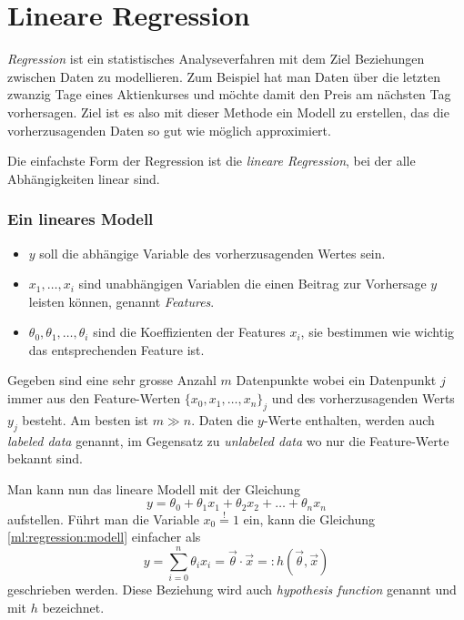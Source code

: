 %
%
%
%

\section{Lineare Regression\label{chapter:ml:regression}}

\emph{Regression} ist ein statistisches Analyseverfahren mit dem Ziel Beziehungen zwischen
Daten zu modellieren. Zum Beispiel hat man Daten über die letzten zwanzig Tage eines
Aktienkurses und möchte damit den Preis am nächsten Tag vorhersagen. Ziel ist es also mit
dieser Methode ein Modell zu erstellen, das die vorherzusagenden Daten so gut wie möglich
approximiert.

Die einfachste Form der Regression ist die \emph{lineare Regression}, bei der alle Abhängigkeiten linear
sind.

\subsubsection{Ein lineares Modell}

\begin{itemize}
    \item $y$ soll die abhängige Variable des vorherzusagenden Wertes sein.
    \item $x_1, \dots, x_i$ sind unabhängigen Variablen die einen Beitrag zur Vorhersage
    $y$ leisten können, genannt \emph{Features}.
    \item $\theta_0, \theta_1, \dots, \theta_i$ sind die Koeffizienten der Features $x_i$,
    sie bestimmen wie wichtig das entsprechenden Feature ist.
\end{itemize}

Gegeben sind eine sehr grosse Anzahl $m$ Datenpunkte wobei ein Datenpunkt $j$ immer aus
den Feature-Werten $\{ x_0, x_1, \dots, x_n \}_j$ und des vorherzusagenden Werts $y_j$ besteht.
Am besten ist $m \gg n$. Daten die $y$-Werte enthalten, werden auch \emph{labeled data} genannt,
im Gegensatz zu \emph{unlabeled data} wo nur die Feature-Werte bekannt sind.

Man kann nun das lineare Modell mit der Gleichung
\begin{equation}
y = \theta_0 + \theta_1 x_1 + \theta_2 x_2 + \dots + \theta_n x_n
\label{ml:regression:modell}
\end{equation}
aufstellen. Führt man die Variable $x_0 \overset{!}{=} 1$ ein, kann die Gleichung
\ref{ml:regression:modell} einfacher als
\begin{equation}
y = \sum_{i = 0}^{n} \theta_i x_i = \vec \theta \cdot \vec x =: h(\vec\theta, \vec x)
\label{ml:regression:hypothesis}
\end{equation}
geschrieben werden. Diese Beziehung wird auch \emph{hypothesis function} genannt und mit
$h$ bezeichnet.

